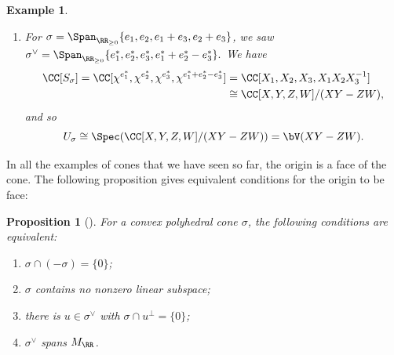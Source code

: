 \documentclass[12pt]{amsart}
\theoremstyle{plain}
\newtheorem{proposition}[theorem]{Proposition}
\newtheorem{example}[theorem]{Example}
\begin{document}
\begin{example}
\begin{enumerate}
\begin{figure}[H]
\end{figure}
\noindent
Observe that while $\{2 e_1^* + e_2^*, e_2^*\}$ generates $\sigma^\vee$ as a cone, it does not generate $S_\sigma$ as a semigroup.
For example, $e_1^* + e_2^* \in S_\sigma$, but $e_1^* + e_2^* \notin \Span_{\ZZ_{\ge 0}} \{2 e_1^* + e_2^*,  e_2^*\}.$
However, $\{2 e_1^* + e_2^*,  e_2^*, e_1^* + e_2^*\}$ does generate $S_\sigma$.
Then
\begin{align*}
	\qquad \CC[S_\sigma] = \CC[\chi^{e_2^*}, \chi^{2 e_1^* + e_2^*}, \chi^{e_1^* + e_2^*}] &= \CC[X_2, X_1^2 X_2, X_1 X_2] \cong \CC[X, Y, Z] / (X Y - Z^2),
\end{align*}
and
$$U_\sigma \cong \Spec(\CC[X, Y, Z] / (XY - Z^2) )= \bV(X Y - Z^2).$$

\item
For $\sigma = \Span_{\RR_{\ge 0}}\{ e_1, e_2, e_1+e_3, e_2 + e_3\}$, we saw $\sigma^\vee = \Span_{\RR_{\ge 0}} \{e_1^*, e_2^*, e_3^*, e_1^* +e_2^* - e_3^*\}.$
We have 
\begin{align*}
	\CC[S_\sigma] = \CC[\chi^{e_1^*}, \chi^{e_2^*}, \chi^{e_3^*}, \chi^{e_1^* +e_2^* - e_3^*}] &= \CC[X_1, X_2, X_3, X_1 X_2 X_3^{-1}] \\
	&\cong \CC[X, Y, Z, W]/(XY - ZW),
\end{align*}
and so
$$U_\sigma \cong \Spec(\CC[X, Y, Z, W] / (XY - ZW) ) = \bV(XY-ZW).$$

\end{enumerate}
\end{example}

In all the examples of cones that we have seen so far, the origin is a face of the cone.
The following proposition gives equivalent conditions for the origin to be face:

\begin{proposition}[{\cite[\S 1.2, Proposition 3]{Fulton93}}]\label{stronglyconvexprop}
For a convex polyhedral cone $\sigma$, the following conditions are equivalent:
\begin{enumerate}
\item $\sigma \cap (-\sigma) = \{0\}$;
\item $\sigma$ contains no nonzero linear subspace;
\item there is $u \in \sigma^\vee$ with $\sigma \cap u^\perp = \{0\}$;
\item $\sigma^\vee$ spans $M_\RR$.
\end{enumerate}
\end{proposition}
\end{document}
